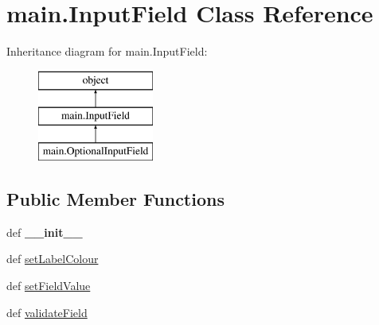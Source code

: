 \hypertarget{classmain_1_1_input_field}{\section{main.\-Input\-Field Class Reference}
\label{classmain_1_1_input_field}
}
Inheritance diagram for main.\-Input\-Field\-:\begin{figure}[H]
\begin{center}
\leavevmode
\includegraphics[height=3.000000cm]{classmain_1_1_input_field}
\end{center}
\end{figure}
\subsection*{Public Member Functions}
\begin{DoxyCompactItemize}
\item 
\hypertarget{classmain_1_1_input_field_aafc7770c960eacd37cd160341a4342e5}{def {\bfseries \-\_\-\-\_\-init\-\_\-\-\_\-}}\label{classmain_1_1_input_field_aafc7770c960eacd37cd160341a4342e5}

\item 
def \hyperlink{classmain_1_1_input_field_a903aabf90ade88f785c38d951ca5641c}{set\-Label\-Colour}
\item 
def \hyperlink{classmain_1_1_input_field_a9682f408d77f5078bb56cc8581ec8c3a}{set\-Field\-Value}
\item 
def \hyperlink{classmain_1_1_input_field_a31152697d4b118599707b46260bdb7d1}{validate\-Field}
\end{DoxyCompactItemize}
